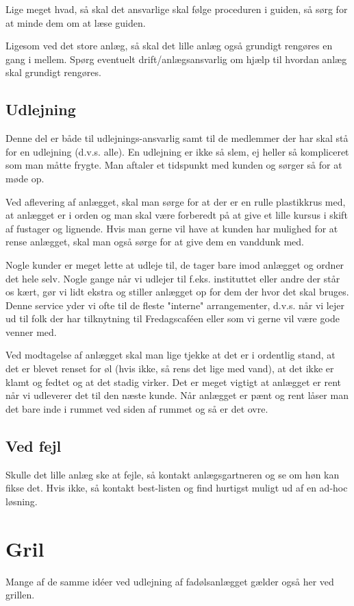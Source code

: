Lige meget hvad, så skal det ansvarlige skal følge proceduren i guiden, så sørg for at minde dem om at læse guiden.


Ligesom ved det store anlæg, så skal det lille anlæg også grundigt rengøres en gang i mellem. Spørg eventuelt drift/anlægsansvarlig om hjælp til hvordan anlæg skal grundigt rengøres.

\subsection{Udlejning}
Denne del er både til udlejnings-ansvarlig samt til de medlemmer der har skal stå for en udlejning (d.v.s. alle). En udlejning er ikke så slem, ej heller så kompliceret som man måtte frygte. Man aftaler et tidspunkt med kunden og sørger så for at møde op.

Ved aflevering af anlægget, skal man sørge for at der er en rulle plastikkrus med, at anlægget er i orden og man skal være forberedt på at give et lille kursus i skift af fustager og lignende. Hvis man gerne vil have at kunden har mulighed for at rense anlægget, skal man også sørge for at give dem en vanddunk med.

Nogle kunder er meget lette at udleje til, de tager bare imod anlægget og ordner det hele selv. Nogle gange når vi udlejer til f.eks. instituttet eller andre der står os kært, gør vi lidt ekstra og stiller anlægget op for dem der hvor det skal bruges. Denne service yder vi ofte til de fleste "interne" arrangementer, d.v.s. når vi lejer ud til folk der har tilknytning til Fredagscaféen eller som vi gerne vil være gode venner med.

Ved modtagelse af anlægget skal man lige tjekke at det er i ordentlig stand, at det er blevet renset for øl (hvis ikke, så rens det lige med vand), at det ikke er klamt og fedtet og at det stadig virker. Det er meget vigtigt at anlægget er rent når vi udleverer det til den næste kunde. Når anlægget er pænt og rent låser man det bare inde i rummet ved siden af rummet og så er det ovre. 
\subsection{Ved fejl}
Skulle det lille anlæg ske at fejle, så kontakt anlægsgartneren og se om høn kan fikse det. Hvis ikke, så kontakt best-listen og find hurtigst muligt ud af en ad-hoc løsning.

\section{Gril}
Mange af de samme idéer ved udlejning af fadølsanlægget gælder også her ved grillen.


